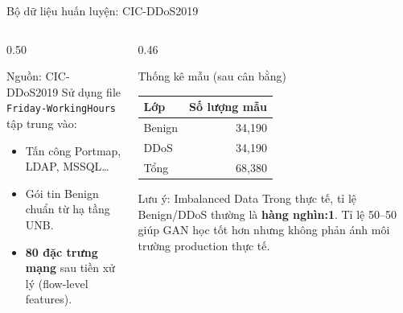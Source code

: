 \documentclass[aspectratio=169,11pt]{beamer}
\begin{document}
\begin{frame}{Bộ dữ liệu huấn luyện: CIC-DDoS2019}
  \begin{columns}[T]
    \begin{column}{0.50\textwidth}
      \begin{block}{Nguồn: CIC-DDoS2019}
        \small
        Sử dụng file \texttt{Friday-WorkingHours} tập trung vào:
        \begin{itemize}
          \item Tấn công Portmap, LDAP, MSSQL\ldots
          \item Gói tin Benign chuẩn từ hạ tầng UNB.
          \item \textbf{80 đặc trưng mạng} sau tiền xử lý
                (flow-level features).
        \end{itemize}
      \end{block}
    \end{column}
    \begin{column}{0.46\textwidth}
      \begin{exampleblock}{Thống kê mẫu (sau cân bằng)}
        \small
        \begin{tabular}{lr}
          \toprule
          Lớp & Số lượng mẫu \\
          \midrule
          Benign & 34{,}190 \\
          DDoS   & 34{,}190 \\
          \midrule
          Tổng   & 68{,}380 \\
          \bottomrule
        \end{tabular}
      \end{exampleblock}
      \vspace{4pt}
      \begin{alertblock}{\footnotesize Lưu ý: Imbalanced Data}
        \footnotesize
        Trong thực tế, tỉ lệ Benign/DDoS thường là \textbf{hàng nghìn:1}.
        Tỉ lệ 50--50 giúp GAN học tốt hơn nhưng không phản ánh môi trường
        production thực tế.
      \end{alertblock}
    \end{column}
  \end{columns}
\end{frame}
\end{document}
